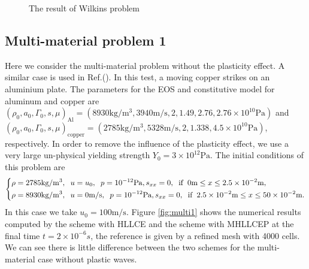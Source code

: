\documentclass{article}
\numberwithin{equation}{section}
\numberwithin{table}{section}
\begin{document}
\begin{figure}
	  \caption{ The result of Wilkins problem}
	  \label{fig:Wilkins1}
	\end{figure}

	\subsection{Multi-material problem 1} \label{pro:multi1}
  Here we consider the multi-material problem without the plasticity effect. A similar case is used in Ref.(\cite{ghaisas2016high}). In this test, a moving  copper strikes on an aluminium plate. The parameters for the EOS and constitutive model for aluminum and copper  are
$ (\rho_0, a_0, \Gamma_0, s, \mu)_{\text{Al}} =(8930 \text{kg}/\text{m}^3, 3940 \text{m}/\text{s},2, 1.49, 2.76 ,2.76\times 10^{10} \text{Pa} )$ and   $(\rho_0, a_0, \Gamma_0, s, \mu)_{\text{copper}} =(2785 \text{kg}/\text{m}^3, 5328 \text{m}/\text{s},2, 1.338,4.5\times 10^{10}\text{Pa})$, respectively. In order to remove the influence of the plasticity effect, we use a very large un-physical yielding strength $Y_0 = 3\times 10^{12} \text{Pa}$.  The initial conditions of this problem are
\begin{equation}\label{eq:initmulti}
  \left\{ \begin{aligned}
	& \rho = 2785 \text{kg}/\text{m}^3, \hspace{0.2cm} u = u_0, \hspace{0.2cm} p = 10^{-12}\text{Pa}, s_{xx} = 0, \hspace{0.2cm} \text{if} \hspace{0.2cm} 0\text{m} \le x \le 2.5\times 10^{-2} \text{m},\\
	&  \rho = 8930 \text{kg}/\text{m}^3, \hspace{0.2cm} u = 0\text{m}/\text{s}, \hspace{0.2cm} p = 10^{-12}\text{Pa}, s_{xx} = 0, \hspace{0.2cm} \text{if} \hspace{0.2cm} 2.5 \times 10^{-2}\text{m} \le x \le 50\times 10^{-2} \text{m}.\\
	\end{aligned}
  \right.
\end{equation}
In this case we take $u_0 = 100 \text{m}/\text{s}$. Figure \ref{fig:multi1}  shows  the numerical results computed by the scheme with HLLCE and the scheme with MHLLCEP at the final time $ t= 2 \times 10^{-6}s$, the reference is given by a refined mesh  with 4000 cells.  We can see there is little difference between the two schemes  for  the multi-material case without plastic waves.
\end{document}
